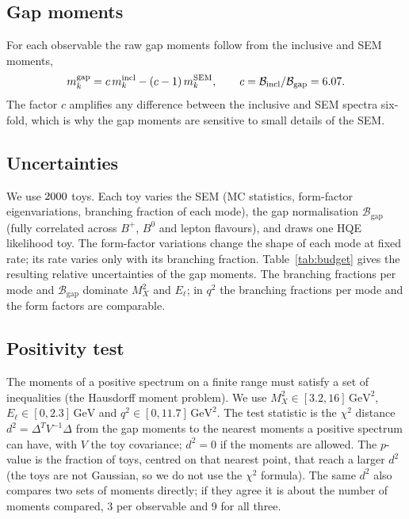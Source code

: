\documentclass[11pt]{article}
\newcommand{\GeV}{\,\mathrm{GeV}}
\newcommand{\Mx}{M_X^2}
\newcommand{\El}{E_\ell}
\newcommand{\BR}{\mathcal{B}}
\begin{document}
\FloatBarrier
\subsection{Gap moments}
For each observable the raw gap moments follow from the inclusive and SEM moments,
\begin{equation*}
m_k^\text{gap} = c\, m_k^\text{incl} - (c-1)\, m_k^\text{SEM}, \qquad c = \BR_\text{incl}/\BR_\text{gap} = \nCTrue .
\end{equation*}
The factor $c$ amplifies any difference between the inclusive and SEM spectra six-fold, which is why the gap moments are
sensitive to small details of the SEM.

\FloatBarrier
\subsection{Uncertainties}
We use $2000$ toys. Each toy varies the SEM (MC statistics, form-factor eigenvariations, branching fraction of each
mode), the gap normalisation $\BR_\text{gap}$ (fully correlated across $B^+$, $B^0$ and lepton flavours), and draws one
HQE likelihood toy. The form-factor variations change the shape of each mode at fixed rate; its rate varies only with
its branching fraction. Table~\ref{tab:budget} gives the resulting relative uncertainties of the gap moments. The
branching fractions per mode and $\BR_\text{gap}$ dominate $\Mx$ and $\El$; in $q^2$ the branching fractions per mode
and the form factors are comparable.
\begin{table}[htbp]\centering\small

\caption{Relative uncertainty of the gap moments $m_{1..3}$ by source, in percent.}\label{tab:budget}
\end{table}

\FloatBarrier
\subsection{Positivity test}
The moments of a positive spectrum on a finite range must satisfy a set of inequalities (the Hausdorff moment problem).
We use $\Mx\in[3.2, 16]\GeV^2$, $\El\in[0, 2.3]\GeV$ and $q^2\in[0, 11.7]\GeV^2$. The test statistic is the $\chi^2$
distance $d^2 = \Delta^T V^{-1}\Delta$ from the gap moments to the nearest moments a positive spectrum can have, with
$V$ the toy covariance; $d^2 = 0$ if the moments are allowed. The $p$-value is the fraction of toys, centred on that
nearest point, that reach a larger $d^2$ (the toys are not Gaussian, so we do not use the $\chi^2$ formula). The same
$d^2$ also compares two sets of moments directly; if they agree it is about the number of moments compared, 3 per
observable and 9 for all three.
\end{document}
